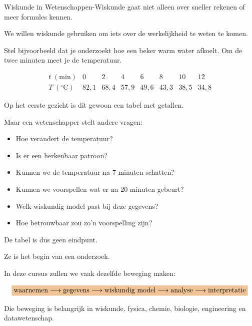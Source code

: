 \documentclass{ximera}
\begin{document}


Wiskunde in Wetenschappen-Wiskunde gaat niet alleen over sneller
rekenen of meer formules kennen.

We willen wiskunde gebruiken om iets over de werkelijkheid te weten
te komen.

Stel bijvoorbeeld dat je onderzoekt hoe een beker warm water afkoelt.
Om de twee minuten meet je de temperatuur.

\[
\begin{array}{c|ccccccc}
t\;(\mathrm{min})
&0&2&4&6&8&10&12\\ \hline
T\;({}^{\circ}\mathrm C)
&82{,}1&68{,}4&57{,}9&49{,}6&43{,}3&38{,}5&34{,}8
\end{array}
\]

Op het eerste gezicht is dit gewoon een tabel met getallen.

Maar een wetenschapper stelt andere vragen:

\begin{itemize}
  \item Hoe verandert de temperatuur?
  \item Is er een herkenbaar patroon?
  \item Kunnen we de temperatuur na $7$ minuten schatten?
  \item Kunnen we voorspellen wat er na $20$ minuten gebeurt?
  \item Welk wiskundig model past bij deze gegevens?
  \item Hoe betrouwbaar zou zo'n voorspelling zijn?
\end{itemize}

De tabel is dus geen eindpunt.

Ze is het begin van een onderzoek.

\begin{opmerking}
In deze cursus zullen we vaak dezelfde beweging maken:

\[
\important{
\text{waarnemen}
\longrightarrow
\text{gegevens}
\longrightarrow
\text{wiskundig model}
\longrightarrow
\text{analyse}
\longrightarrow
\text{interpretatie}
}
\]

Die beweging is belangrijk in wiskunde, fysica, chemie, biologie,
engineering en datawetenschap.
\end{opmerking}


\end{document}
